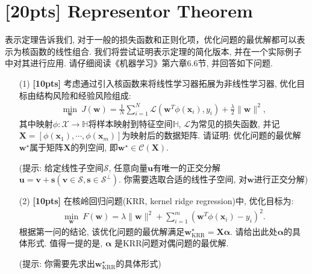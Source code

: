 \documentclass[a4paper,UTF8]{article}
\numberwithin{equation}{section}
\theoremstyle{definition}
\def \X {\boldsymbol{X}}
\def \w {\boldsymbol{w}}
\def \u {\boldsymbol{u}}
\def \v {\boldsymbol{v}}
\def \s {\boldsymbol{s}}
\def \x {\boldsymbol{x}}
\def \boldalpha {\boldsymbol{\alpha}}
\begin{document}
\section{[20pts] Representor Theorem}
表示定理告诉我们, 对于一般的损失函数和正则化项，优化问题的最优解都可以表示为核函数的线性组合. 我们将尝试证明表示定理的简化版本, 
并在一个实际例子中对其进行应用. 请仔细阅读《机器学习》第六章6.6节, 并回答如下问题.
\begin{enumerate}
    \item[(1)] \textbf{[10pts]} 考虑通过引入核函数来将线性学习器拓展为非线性学习器, 优化目标由结构风险和经验风险组成:
    \begin{align*}
        \min_{\w} \  J(\w) = \frac{1}{N} \sum_{i=1}^N \mathcal{L}\left(\w^T \phi(\x_i), y_i \right) + \frac{\lambda}{2}\|\w\|^2,
    \end{align*}
    其中映射$\phi: \mathcal{X} \to \mathbb{H}$将样本映射到特征空间$\mathbb{H}$, $\mathcal{L}$为常见的损失函数,
    并记$\X = \left[\phi(\x_1), \cdots, \phi(\x_m)\right]$为映射后的数据矩阵. 请证明: 优化问题的最优解$\w^\star$属于矩阵$\X$的列空间, 即$\w^\star \in \mathcal{C}(\X)$.

    (提示: 给定线性子空间$\mathcal{S}$, 任意向量$\u$有唯一的正交分解$\u = \v + \s(\v \in \mathcal{S}, \s \in \mathcal{S}^{\perp})$. 你需要选取合适的线性子空间, 对$\w$进行正交分解)
    \item[(2)] \textbf{[10pts]} 在核岭回归问题(KRR, kernel ridge regression)中, 优化目标为:
    \begin{align*}
        \min_{\w} \  F(\w) = \lambda\|\w\|^2+\sum_{i=1}^m\left(\w^T\phi(\x_i)-y_i\right)^2.
    \end{align*}
    根据第一问的结论, 该优化问题的最优解满足$\w_{\text{KRR}}^\star = \X \boldalpha$. 请给出此处$\boldalpha$的具体形式. 值得一提的是, $\boldalpha$
    是KRR问题对偶问题的最优解.

    (提示: 你需要先求出$\w_{\text{KRR}}^\star$的具体形式)
\end{enumerate}
\end{document}
